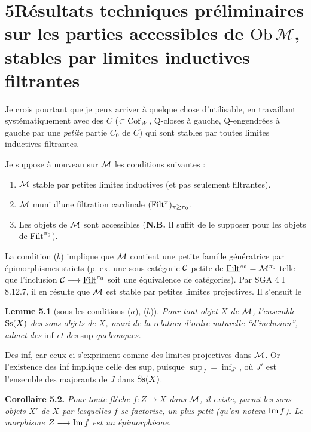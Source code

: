 \section*{5\quad Résultats techniques préliminaires sur les parties accessibles de $\mathrm{Ob}\,\mathcal{M}$, stables par limites inductives filtrantes}

Je crois pourtant que je peux arriver à quelque chose d'utilisable, en travaillant systématiquement avec des $C$ ($\subset\mathrm{Cof}_W$, Q-closes à gauche, Q-engendrées à gauche par une \textit{petite} partie $C_0$ de $C$) qui sont stables par toutes limites inductives filtrantes.


Je suppose à nouveau sur $\mathcal{M}$ les conditions suivantes :

\begin{enumerate}[nosep]
\item[\textit{a})] $\mathcal{M}$ stable par petites limites inductives (et pas seulement filtrantes).
\item[\textit{b})] $\mathcal{M}$ muni d'une filtration cardinale $(\mathrm{Filt}^{\pi})_{\pi\geq\pi_0}$.
\item[\textit{c})] Les objets de $\mathcal{M}$ sont accessibles (\textbf{N.B.} Il suffit de le supposer pour les objets de $\mathrm{Filt}^{\pi_0}$).
\end{enumerate}

La condition ($b$) implique que $\mathcal{M}$ contient une petite famille génératrice par épimorphismes stricts (p. ex. une sous-catégorie $\mathcal{C}$ petite de $\underline{\mathrm{Filt}}^{\pi_0} = \mathcal{M}^{\pi_0}$ telle que l'inclusion $\mathcal{C} \longrightarrow \underline{\mathrm{Filt}}^{\pi_0}$ soit une équivalence de catégories). Par SGA 4 I 8.12.7, il en résulte que $\mathcal{M}$ est stable par petites limites projectives. Il s'ensuit le

\textbf{Lemme 5.1} (sous les conditions ($a$), ($b$)). \textit{Pour tout objet $X$ de $\mathcal{M}$, l'ensemble} $\mathrm{Ss}(X)$ \textit{des sous-objets de $X$, muni de la relation d'ordre naturelle ``d'inclusion'', admet des} inf \textit{et des} sup \textit{quelconques.}

Des inf, car ceux-ci s'expriment comme des limites projectives dans $\mathcal{M}$. Or l'existence des inf implique celle des sup, puisque $\sup_J = \inf_{J'}$, où $J'$ est l'ensemble des majorants de $J$ dans $\mathrm{Ss}(X)$.

\textbf{Corollaire 5.2.} \textit{Pour toute flèche $f : Z \longrightarrow X$ dans $\mathcal{M}$, il existe, parmi les sous-objets $X'$ de $X$ par lesquelles $f$ se factorise, un plus petit} %
\textit{(qu'on notera} $\mathrm{Im}\, f$\textit{). Le morphisme $Z \longrightarrow \mathrm{Im}\, f$ est un épimorphisme.}

